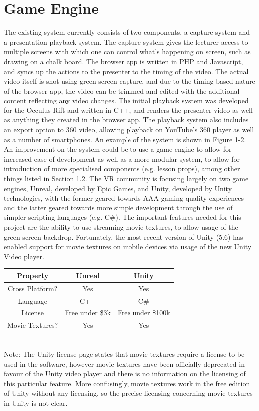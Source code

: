 \documentclass[11pt]{report}
\begin{document}
\section{Game Engine}
The existing system currently consists of two components, a capture system and a presentation playback system. The capture system gives the lecturer access to multiple screens with which one can control what's happening on screen, such as drawing on a chalk board. The browser app is written in PHP and Javascript, and syncs up the actions to the presenter to the timing of the video. The actual video itself is shot using green screen capture, and due to the timing based nature of the browser app, the video can be trimmed and edited with the additional content reflecting any video changes. The initial playback system was developed for the Occulus Rift and written in C++, and renders the presenter video as well as anything they created in the browser app. The playback system also includes an export option to 360 video, allowing playback on YouTube's 360 player as well as a number of smartphones. An example of the system is shown in Figure 1-2. An improvement on the system could be to use a game engine to allow for increased ease of development as well as a more modular system, to allow for introduction of more specialised components (e.g. lesson props), among other things listed in Section 1.2. The VR community is focusing largely on two game engines, Unreal, developed by Epic Games, and Unity, developed by Unity technologies, with the former geared towards AAA gaming quality experiences and the latter geared towards more simple development through the use of simpler scripting languages (e.g. C\#). The important features needed for this project are the ability to use streaming movie textures, to allow usage of the green screen backdrop. Fortunately, the most recent version of Unity (5.6) has enabled support for movie textures on mobile devices via usage of the new Unity Video player. 
\begin{center}
\begin{tabular}{||c c c||} 
\hline
Property & Unreal & Unity \\ [0.5ex] 
\hline\hline
Cross Platform? & Yes & Yes \\ 
\hline
Language& C++ & C\# \\
\hline
License & Free under \$3k & Free under \$100k \* \\
\hline
Movie Textures? &Yes & Yes \\
\hline
\end{tabular}\\
\* Note: The Unity license page states that movie textures require a license to be used in the software, however movie textures have been officially deprecated in favour of the Unity video player and there is no information on the licensing of this particular feature. More confusingly, movie textures work in the free edition of Unity without any licensing, so the precise licensing concerning movie textures in Unity is not clear.
\end{center}
\end{document}
